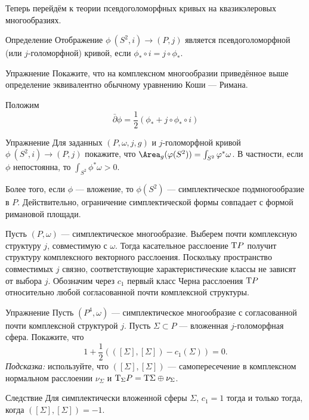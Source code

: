 Теперь перейдём к теории псевдоголоморфных кривых на квазикэлеровых многообразиях.

\begin{ex*}{Определение}
Отображение $\phi\:(S^2, i) \to (P, j)$ является псевдоголоморфной (или $j$-голоморфной) кривой, если 
$\phi_\ast \circ i = j \circ \phi_\ast$.
\end{ex*}

\begin{ex}{Упражнение}\label{10.2.D}
Покажите, что на комплексном многообразии приведённое выше определение эквивалентно обычному уравнению Коши --- Римана.
\end{ex}

Положим 
\[\bar\partial\phi=\frac12(\phi_\ast+j\circ\phi_\ast\circ i)\]

\begin{ex}[(ср. \ref{4.1.A})]{Упражнение}\label{10.2.E}
Для заданных $(P, \omega, j, g)$ и $j$-голоморфной кривой $\phi \: (S^2, i) \to (P, j)$ покажите, что $\Area_g (\phi(S^2)) = \int_{S^2}\phi^\ast \omega$.
В частности, если $\phi$ непостоянна, то $\int_{S^2} \phi^\ast \omega > 0$.
\end{ex}

Более того, если $\phi$ --- вложение, то $\phi(S^2)$ --- симплектическое подмногообразие в $P$.
Действительно, ограничение симплектической формы совпадает с формой римановой площади.

Пусть $(P, \omega)$ --- симплектическое многообразие.
Выберем почти комплексную структуру $j$, совместимую с $\omega$.
Тогда касательное расслоение $\mathrm{T} P$ получит структуру комплексного векторного расслоения.
Поскольку пространство совместимых $j$ связно, соответствующие характеристические классы не зависят от выбора $j$.
Обозначим через $c_1$ первый класс Черна расслоения $\mathrm{T} P$ относительно любой согласованной почти комплексной структуры.

\begin{ex}{Упражнение}\label{10.2.F}
Пусть $(P^4, \omega)$ --- симплектическое многообразие с согласованной почти комплексной структурой $j$.
Пусть $\Sigma \subset P$ --- вложенная $j$-голоморфная сфера.
Покажите, что
\[1 +\frac12 (([\Sigma], [\Sigma]) - c_1 (\Sigma)) = 0.\]
\emph{Подсказка:} используйте, что $([\Sigma], [\Sigma])$ --- самопересечение в комплексном нормальном расслоении $\nu_\Sigma$ и $\mathrm{T}_\Sigma P = \mathrm{T}\Sigma \oplus \nu_\Sigma$.
\end{ex}


\begin{thm*}{Следствие} Для симплектически вложенной сферы $\Sigma$, $c_1 = 1$ тогда и только тогда, когда $([\Sigma], [\Sigma]) = -1$.
\end{thm*}

